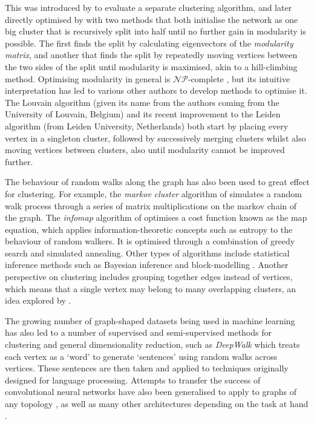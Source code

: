 This was introduced by \citet{Newman2004} to evaluate a separate clustering algorithm, and later directly optimised by \citet{Newman2006Modularity} with two methods that both initialise the network as one big cluster that is recursively split into half until no further gain in modularity is possible. The first finds the split by calculating eigenvectors of the \emph{modularity matrix}, and another that finds the split by repeatedly moving vertices between the two sides of the split until modularity is maximised, akin to a hill-climbing method.
Optimising modularity in general is $\mathcal{NP}$-complete \citep{Brandes2007Modularity}, but its intuitive interpretation has led to various other authors to develop methods to optimise it. The Louvain algorithm (given its name from the authors coming from the University of Louvain, Belgium) \citep{Blondel2008} and its recent improvement to the Leiden algorithm (from Leiden University, Netherlands) \citep{Traag2019} both start by placing every vertex in a singleton cluster, followed by successively merging clusters whilst also moving vertices between clusters, also until modularity cannot be improved further.

The behaviour of random walks along the graph has also been used to great effect for clustering. For example, the \emph{markov cluster} algorithm of \citet{Enright2002} simulates a random walk process through a series of matrix multiplications on the markov chain of the graph.
The \emph{infomap} algorithm of \citet{Rosvall2008} optimises a cost function known as the map equation, which applies information-theoretic concepts such as entropy to the behaviour of random walkers. It is optimised through a combination of greedy search and simulated annealing.
Other types of algorithms include statistical inference methods such as Bayesian inference \citep{Hastings2006} and block-modelling \citep{Reichardt2007}.
Another perspective on clustering includes grouping together edges instead of vertices, which means that a single vertex may belong to many overlapping clusters, an idea explored by \citet{Evans2009}.

The growing number of graph-shaped datasets being used in machine learning has also led to a number of supervised and semi-supervised methods for clustering and general dimensionality reduction, such as \emph{DeepWalk} \citep{Perozzi2014} which treats each vertex as a `word' to generate `sentences' using random walks across vertices. These sentences are then taken and applied to techniques originally designed for language processing. Attempts to transfer the success of convolutional neural networks have also been generalised to apply to graphs of any topology \citep{Kipf2016, LeCun2017}, as well as many other architectures depending on the task at hand \citep{Battaglia2018, Wu2020}.

